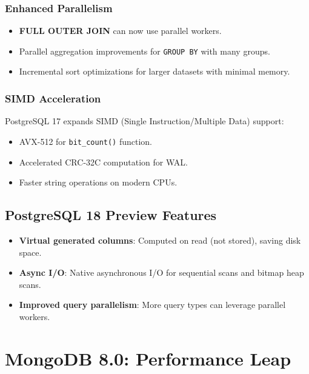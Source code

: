 \documentclass[12pt,a4paper]{article}
\begin{document}
\subsubsection{Enhanced Parallelism}

\begin{itemize}
    \item \textbf{FULL OUTER JOIN} can now use parallel workers.
    \item Parallel aggregation improvements for \texttt{GROUP BY} with many groups.
    \item Incremental sort optimizations for larger datasets with minimal memory.
\end{itemize}

\subsubsection{SIMD Acceleration}

PostgreSQL 17 expands SIMD (Single Instruction/Multiple Data) support:
\begin{itemize}
    \item AVX-512 for \texttt{bit\_count()} function.
    \item Accelerated CRC-32C computation for WAL.
    \item Faster string operations on modern CPUs.
\end{itemize}

\subsection{PostgreSQL 18 Preview Features}

\begin{itemize}
    \item \textbf{Virtual generated columns}: Computed on read (not stored), saving disk space.
    \item \textbf{Async I/O}: Native asynchronous I/O for sequential scans and bitmap heap scans.
    \item \textbf{Improved query parallelism}: More query types can leverage parallel workers.
\end{itemize}


\section{MongoDB 8.0: Performance Leap}
\end{document}
